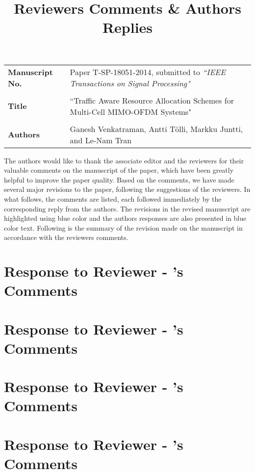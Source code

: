 \documentclass[10pt,letterpaper,onecolumn]{article}
\begin{document}
\title{Reviewers Comments \& Authors Replies}

\date{}
\maketitle

\begin{tabular}{p{1.25in}p{4.25in}}
\textbf{Manuscript No.} & Paper T-SP-18051-2014, submitted to \emph{``IEEE Transactions on Signal Processing"} \\ \\
\textbf{Title} & ``Traffic Aware Resource Allocation Schemes for Multi-Cell MIMO-OFDM Systems" \\ \\
\textbf{Authors} & Ganesh Venkatraman, Antti T\"{o}lli, Markku Juntti, and Le-Nam Tran
\end{tabular}

\vspace{0.5in}
The authors would like to thank the associate editor and the reviewers for their valuable comments on the manuscript of the paper, which have been greatly helpful to improve the paper quality. Based on the comments, we have made several major revisions to the paper, following the suggestions of the reviewers. In what follows, the comments are listed, each followed immediately by the corresponding reply from the authors. The revisions in the revised manuscript are highlighted using blue color and the authors responses are also presented in blue color text. Following is the summary of the revision made on the manuscript in accordance with the reviewers comments.


\newpage
\section*{Response to Reviewer - 's Comments}


\newpage
\section*{Response to Reviewer - 's Comments}


\newpage
\section*{Response to Reviewer - 's Comments}


\newpage
\section*{Response to Reviewer - 's Comments}

\end{document}
